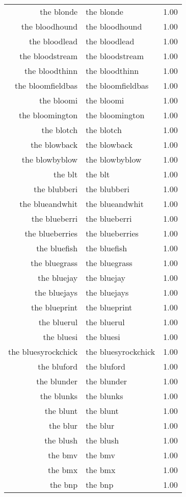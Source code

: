 \begin{table}[ht]
\begin{tabular}{rlr}
  the blonde & the blonde & 1.00 \\ 
  the bloodhound & the bloodhound & 1.00 \\ 
  the bloodlead & the bloodlead & 1.00 \\ 
  the bloodstream & the bloodstream & 1.00 \\ 
  the bloodthinn & the bloodthinn & 1.00 \\ 
  the bloomfieldbas & the bloomfieldbas & 1.00 \\ 
  the bloomi & the bloomi & 1.00 \\ 
  the bloomington & the bloomington & 1.00 \\ 
  the blotch & the blotch & 1.00 \\ 
  the blowback & the blowback & 1.00 \\ 
  the blowbyblow & the blowbyblow & 1.00 \\ 
  the blt & the blt & 1.00 \\ 
  the blubberi & the blubberi & 1.00 \\ 
  the blueandwhit & the blueandwhit & 1.00 \\ 
  the blueberri & the blueberri & 1.00 \\ 
  the blueberries & the blueberries & 1.00 \\ 
  the bluefish & the bluefish & 1.00 \\ 
  the bluegrass & the bluegrass & 1.00 \\ 
  the bluejay & the bluejay & 1.00 \\ 
  the bluejays & the bluejays & 1.00 \\ 
  the blueprint & the blueprint & 1.00 \\ 
  the bluerul & the bluerul & 1.00 \\ 
  the bluesi & the bluesi & 1.00 \\ 
  the bluesyrockchick & the bluesyrockchick & 1.00 \\ 
  the bluford & the bluford & 1.00 \\ 
  the blunder & the blunder & 1.00 \\ 
  the blunks & the blunks & 1.00 \\ 
  the blunt & the blunt & 1.00 \\ 
  the blur & the blur & 1.00 \\ 
  the blush & the blush & 1.00 \\ 
  the bmv & the bmv & 1.00 \\ 
  the bmx & the bmx & 1.00 \\ 
  the bnp & the bnp & 1.00 \\ 

\end{tabular}
\end{table}
